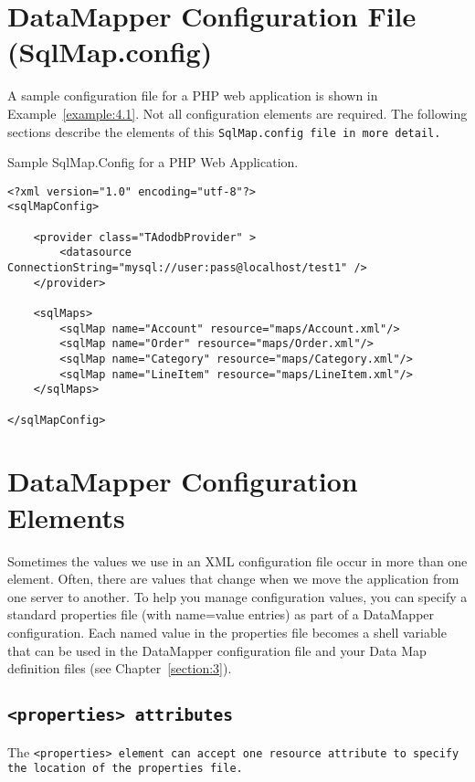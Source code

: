\section{DataMapper Configuration File (SqlMap.config)}
A sample configuration file for a PHP web application is shown in
Example~\ref{example:4.1}. Not all configuration elements are required. The
following sections describe the elements of this \tt{SqlMap.config} file in
more detail.

\begin{example}\label{example:4.1}
Sample SqlMap.Config for a PHP Web Application.
\begin{verbatim}
<?xml version="1.0" encoding="utf-8"?>
<sqlMapConfig>

    <provider class="TAdodbProvider" >
        <datasource ConnectionString="mysql://user:pass@localhost/test1" />
    </provider>

    <sqlMaps>
        <sqlMap name="Account" resource="maps/Account.xml"/>
        <sqlMap name="Order" resource="maps/Order.xml"/>
        <sqlMap name="Category" resource="maps/Category.xml"/>
        <sqlMap name="LineItem" resource="maps/LineItem.xml"/>
    </sqlMaps>

</sqlMapConfig>
\end{verbatim}
\end{example}

\section{DataMapper Configuration Elements}
Sometimes the values we use in an XML configuration file occur in more than
one element. Often, there are values that change when we move the application
from one server to another. To help you manage configuration values, you can
specify a standard properties file (with name=value entries) as part of a
DataMapper configuration. Each named value in the properties file becomes a
shell variable that can be used in the DataMapper configuration file and your
Data Map definition files (see Chapter~\ref{section:3}).

\subsection{\tt{<properties>} attributes}
The \tt{<properties>} element can accept one \tt{resource} attribute to
specify the location of the properties file.

